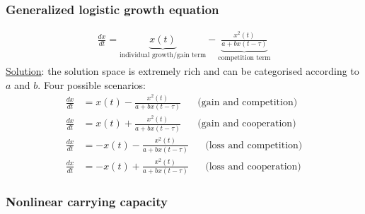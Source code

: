 \subsubsection{Generalized logistic growth equation}
\begin{align*}
    \frac{d x}{d t} = \underbrace{x(t)}_{\text{individual growth/gain term}}
        - \underbrace{\frac{x^2(t)}{a + b x(t-\tau)}}_{\text{competition term}}
\end{align*}
\underline{Solution}: the solution space is extremely rich and can be categorised
according to $a$ and $b$. Four possible scenarios:
\begin{align*}
    \frac{d x}{d t} &= x(t) - \frac{x^2(t)}{a + b x(t-\tau)}
    \hspace{20pt} \text{(gain and competition)}
    \\
    \frac{d x}{d t} &= x(t) + \frac{x^2(t)}{a + b x(t-\tau)}
    \hspace{20pt} \text{(gain and cooperation)}
    \\
    \frac{d x}{d t} &= - x(t) - \frac{x^2(t)}{a + b x(t-\tau)}
    \hspace{20pt} \text{(loss and competition)}
    \\
    \frac{d x}{d t} &= - x(t) + \frac{x^2(t)}{a + b x(t-\tau)}
    \hspace{20pt} \text{(loss and cooperation)}
\end{align*}

\subsubsection{Nonlinear carrying capacity}

